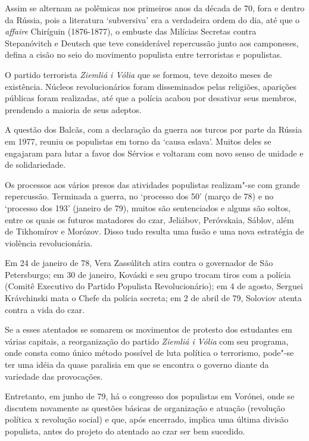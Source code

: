 Assim se alternam as polêmicas nos primeiros anos da década de 70, fora
e dentro da Rússia, pois a literatura `subversiva' era a verdadeira
ordem do dia, até que o \emph{affaire} Chiríguin (1876-1877), o embuste
das Milícias Secretas contra Stepanóvitch e Deutsch que teve
considerável repercussão junto aos camponeses, defina a cisão no seio do
movimento populista entre terroristas e populistas.

O partido terrorista \emph{Ziemliá i Vólia} que se formou, teve dezoito
meses de existência. Núcleos revolucionários foram disseminados pelas
religiões, aparições públicas foram realizadas, até que a polícia acabou
por desativar seus membros, prendendo a maioria de seus adeptos.

A questão dos Balcãs, com a declaração da guerra aos turcos por parte da
Rússia em 1977, reuniu os populistas em torno da `causa eslava'. Muitos
deles se engajaram para lutar a favor dos Sérvios e voltaram com novo
senso de unidade e de solidariedade.

Os processos aos vários presos das atividades populistas realizam"-se com
grande repercussão. Terminada a guerra, no `processo dos 50' (março de
78) e no `processo dos 193' (janeiro de 79), muitos são sentenciados e
alguns são soltos, entre os quais os futuros matadores do czar,
Jeliábov, Peróvskaia, Sáblov, além de Tikhomírov e Morózov. Disso tudo
resulta uma fusão e uma nova estratégia de violência revolucionária.

Em 24 de janeiro de 78, Vera Zassúlitch atira contra o governador de São
Petersburgo; em 30 de janeiro, Kováski e seu grupo trocam tiros com a
polícia (Comitê Executivo do Partido Populista Revolucionário); em 4 de
agosto, Serguei Krávchinski mata o Chefe da polícia secreta; em 2 de
abril de 79, Soloviov atenta contra a vida do czar.

Se a esses atentados se somarem os movimentos de protesto dos estudantes
em várias capitais, a reorganização do partido \emph{Ziemliá i Vólia}
com seu programa, onde consta como único método possível de luta
política o terrorismo, pode"-se ter uma idéia da quase paralisia em que
se encontra o governo diante da variedade das provocações.

Entretanto, em junho de 79, há o congresso dos populistas em Vorónei,
onde se discutem novamente as questões básicas de organização e atuação
(revolução política x revolução social) e que, após encerrado, implica
uma última divisão populista, antes do projeto do atentado ao czar ser
bem sucedido.


